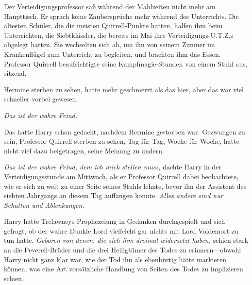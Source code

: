 Der Verteidigungsprofessor saß während der Mahlzeiten nicht mehr am Haupttisch.
Er sprach keine Zaubersprüche mehr während des Unterrichts. Die ältesten Schüler, die die meisten Quirrell-Punkte hatten, halfen ihm beim Unterrichten, die Siebtklässler, die bereits im Mai ihre Verteidigungs-U.T.Z.s abgelegt hatten. Sie wechselten sich ab, um ihn von seinem Zimmer im Krankenflügel zum Unterricht zu begleiten, und brachten ihm das Essen. Professor Quirrell beaufsichtigte seine Kampfmagie-Stunden von einem Stuhl aus, sitzend.

Hermine sterben zu sehen, hatte mehr geschmerzt als das hier, aber das war viel schneller vorbei gewesen.

\emph{Das ist der wahre Feind.}

Das hatte Harry schon gedacht, nachdem Hermine gestorben war. Gezwungen zu sein, Professor Quirrell sterben zu sehen, Tag für Tag, Woche für Woche, hatte nicht viel dazu beigetragen, seine Meinung zu ändern.

\emph{Das ist der wahre Feind, dem ich mich stellen muss,} dachte Harry in der Verteidigungsstunde am Mittwoch, als er Professor Quirrell dabei beobachtete, wie er sich zu weit zu einer Seite seines Stuhls lehnte, bevor ihn der Assistent des siebten Jahrgangs an diesem Tag auffangen konnte.
\emph{Alles andere sind nur Schatten und Ablenkungen.}

Harry hatte Trelawneys Prophezeiung in Gedanken durchgespielt und sich gefragt, ob der wahre Dunkle Lord vielleicht gar nichts mit Lord Voldemort zu tun hatte.
\emph{Geboren von denen, die sich ihm dreimal widersetzt haben,} schien stark an die Peverell-Brüder und die drei Heiligtümer des Todes zu erinnern—obwohl Harry nicht ganz klar war, wie der Tod ihn als ebenbürtig hätte markieren können, was eine Art vorsätzliche Handlung von Seiten des Todes zu implizieren schien.

